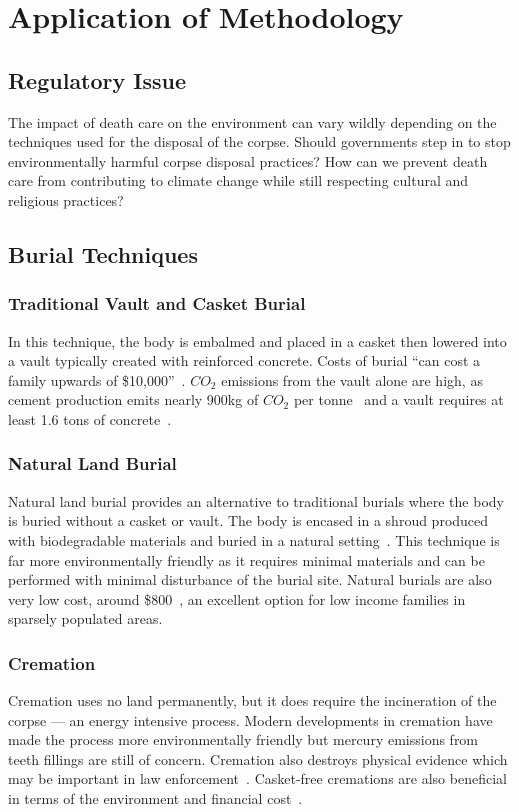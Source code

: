 \documentclass[a4paper,12pt]{article}
\begin{document}
\section{Application of Methodology}
\subsection{Regulatory Issue}
The impact of death care on the environment can vary wildly depending on the techniques used for the disposal of the corpse.
Should governments step in to stop environmentally harmful corpse disposal practices?
How can we prevent death care from contributing to climate change while still respecting cultural and religious practices?
\subsection{Burial Techniques}
\subsubsection{Traditional Vault and Casket Burial}
In this technique, the body is embalmed and placed in a casket then lowered into a vault typically created with reinforced concrete.
Costs of burial ``can cost a family upwards of \$10,000''~\cite{cultureandcarbon}.
$CO_2$ emissions from the vault alone are high, as cement production emits nearly 900kg of $CO_2$ per tonne~\cite{mahasenan2003cement} and a vault requires at least 1.6 tons of concrete~\cite[p.13]{layfield2014life}.
\subsubsection{Natural Land Burial}
Natural land burial provides an alternative to traditional burials where the body is buried without a casket or vault.
The body is encased in a shroud produced with biodegradable materials and buried in a natural setting~\cite{layfield2014life}.
This technique is far more environmentally friendly as it requires minimal materials and can be performed with minimal disturbance of the burial site.
Natural burials are also very low cost, around \$800~\cite[p.2]{cultureandcarbon}, an excellent option for low income families in sparsely populated areas.
\subsubsection{Cremation}
Cremation uses no land permanently, but it does require the incineration of the corpse --- an energy intensive process.
Modern developments in cremation have made the process more environmentally friendly but mercury emissions from teeth fillings are still of concern.
Cremation also destroys physical evidence which may be important in law enforcement~\cite{buschmann2014cremation}.
Casket-free cremations are also beneficial in terms of the environment and financial cost~\cite[p.4]{cultureandcarbon}.
\end{document}
